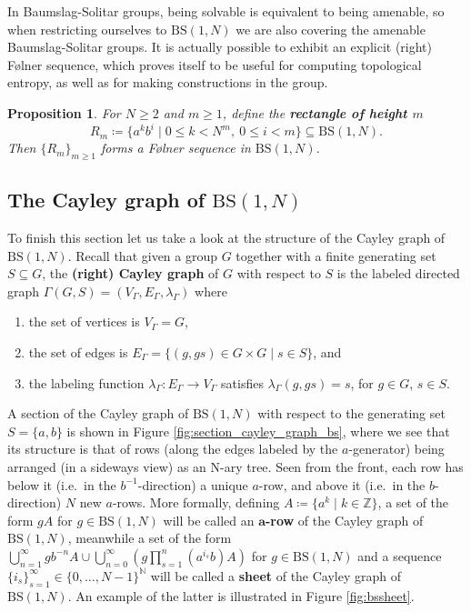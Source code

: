 \documentclass{aims}
\newcommand{\BS}[1][N]{\mathrm{BS}(1,#1)}
\newtheorem{proposition}{Proposition}
\theoremstyle{definition}
\begin{document}
In Baumslag-Solitar groups, being solvable is equivalent to being amenable, so when restricting ourselves to $\BS$ we are also covering the amenable Baumslag-Solitar groups. It is actually possible to exhibit an explicit (right) F\o lner sequence, which proves itself to be useful for computing topological entropy, as well as for making constructions in the group.

\begin{proposition}\label{prop:rectangles_and_folner} For $N\ge 2$ and $m\ge 1$, define the \textbf{rectangle of height $m$}
	$$
	R_m\coloneqq \{a^kb^i\mid 0\le k<N^m, \ 0\le i<m  \}\subseteq \BS.
	$$
	Then $\{R_m\}_{m\ge 1}$ forms a F\o lner sequence in $\BS$.
\end{proposition}





\subsection{The Cayley graph of $\BS$}
To finish this section let us take a look at the structure of the Cayley graph of $\BS$. Recall that given a group $G$ together with a finite generating set $S\subseteq G$, the \textbf{(right) Cayley graph} of $G$ with respect to $S$ is the labeled directed graph  $\Gamma(G,S)=(V_{\Gamma},E_{\Gamma},\lambda_{\Gamma})$ where
\begin{enumerate}
	\item the set of vertices is $V_\Gamma=G$, 
	\item the set of edges is $E_{\Gamma}=\{(g,gs)\in G\times G\mid s\in S\}$, and
	\item the labeling function $\lambda_{\Gamma}:E_{\Gamma}\to V_{\Gamma}$ satisfies $\lambda_{\Gamma}(g,gs)=s$, for $g\in G$, $s\in S$.
\end{enumerate}


A section of the Cayley graph of $\BS$ with respect to the generating set $S=\{a,b\}$ is shown in Figure \ref{fig:section_cayley_graph_bs}, where we see that its structure is that of rows (along the edges labeled by the $a$-generator) being arranged (in a sideways view) as an N-ary tree. Seen from the front, each row has below it (i.e.\ in the $b^{-1}$-direction) a unique $a$-row, and above it (i.e.\ in the $b$-direction) $N$ new $a$-rows. More formally, defining $A\coloneqq\{a^k \mid k\in\mathbb{Z}\}$, a set of the form $gA$ for $g\in \BS$ will be called an $\mathbf{a}$\textbf{-row} of the Cayley graph of $\BS$, meanwhile a set of the form $\displaystyle\bigcup_{n=1}^{\infty}gb^{-n}A  \cup\bigcup_{n=0}^\infty\left( g\prod_{s=1}^{n}(a^{i_s}b)A \right)$ for $g\in \BS$ and a sequence $\{i_s\}_{s=1}^{\infty}\in \{0,\ldots,N-1\}^{\mathbb{N}}$ will be called a \textbf{sheet} of the Cayley graph of $\BS$. An example of the latter is illustrated in Figure \ref{fig:bssheet}. 
\end{document}
